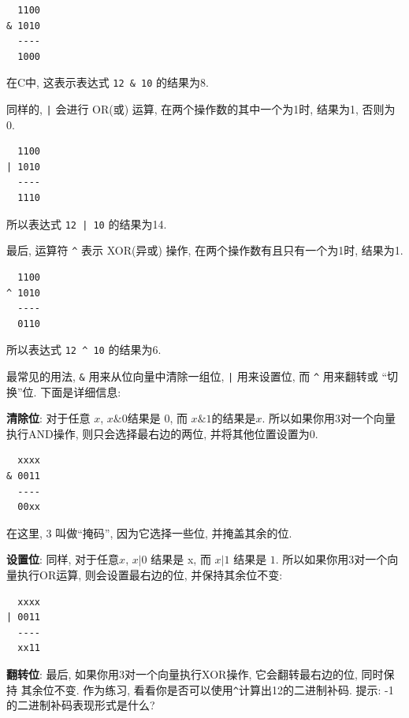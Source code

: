 \documentclass[12pt]{book}
\begin{document}
{\begin{verbatim}
  1100
& 1010
  ----
  1000
\end{verbatim}
%
在C中, 这表示表达式 \verb"12 & 10" 的结果为8.

同样的, \verb"|" 会进行 OR(或) 运算, 
在两个操作数的其中一个为1时, 结果为1, 否则为0.

\begin{verbatim}
  1100
| 1010
  ----
  1110
\end{verbatim}
%
所以表达式 \verb"12 | 10" 的结果为14.

最后, 运算符 \verb"^" 表示 XOR(异或) 操作, 在两个操作数有且只有一个为1时, 
结果为1.

\begin{verbatim}
  1100
^ 1010
  ----
  0110
\end{verbatim}
%
所以表达式 \verb"12 ^ 10" 的结果为6.

最常见的用法, \verb"&" 用来从位向量中清除一组位, \verb"|" 用来设置位,
而 \verb"^" 用来翻转或 ``切换''位. 下面是详细信息:

{\bf 清除位}: 对于任意 $x$, $x \& 0$结果是 0, 而 $x \& 1$的结果是$x$.
所以如果你用3对一个向量执行AND操作, 则只会选择最右边的两位, 并将其他位置设置为0.
%

\begin{verbatim}
  xxxx
& 0011
  ----
  00xx
\end{verbatim}
%
在这里, 3 叫做``掩码'', 因为它选择一些位, 并掩盖其余的位.

{\bf 设置位}: 同样, 对于任意$x$, $x | 0$ 结果是 x, 而 $x | 1$ 结果是 $1$.
所以如果你用3对一个向量执行OR运算, 则会设置最右边的位, 并保持其余位不变:
%
\begin{verbatim}
  xxxx
| 0011
  ----
  xx11
\end{verbatim}
%
{\bf 翻转位}: 最后, 如果你用3对一个向量执行XOR操作, 它会翻转最右边的位, 同时保持
其余位不变. 作为练习, 看看你是否可以使用\verb"^"计算出12的二进制补码.
提示: -1 的二进制补码表现形式是什么?

}
\end{document}
